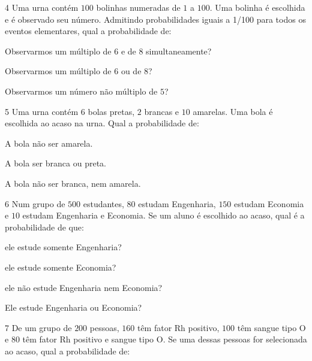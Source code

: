 
\num{4}  Uma urna contém $100$ bolinhas numeradas de $1$ a $100$. Uma bolinha é
escolhida e é observado seu número. Admitindo probabilidades iguais a
1/100 para todos os eventos elementares, qual a probabilidade de:

\begin{escolha}
\item Observarmos um múltiplo de $6$ e de $8$ simultaneamente? 
\item Observarmos um múltiplo de $6$ ou de $8$? 
\item Observarmos um número não múltiplo de $5$? 
\end{escolha}

\num{5}  Uma urna contém $6$ bolas pretas, $2$ brancas e $10$ amarelas. Uma bola é
escolhida ao acaso na urna. Qual a probabilidade de:

\begin{escolha}
\item A bola não ser amarela. 
\item A bola ser branca ou preta. 
\item A bola não ser branca, nem amarela. 
\end{escolha}

\num{6}  Num grupo de $500$ estudantes, $80$ estudam Engenharia, $150$ estudam
Economia e $10$ estudam Engenharia e Economia. Se um aluno é escolhido ao
acaso, qual é a probabilidade de que:

\begin{escolha}
\item ele estude somente Engenharia? 
\item ele estude somente Economia? 
\item ele não estude Engenharia nem Economia? 
\item Ele estude Engenharia ou Economia? 
\end{escolha}


\num{7}  De um grupo de $200$ pessoas, $160$ têm fator Rh positivo, $100$ têm sangue
tipo O e $80$ têm fator Rh positivo e sangue tipo O. Se uma dessas pessoas
for selecionada ao acaso, qual a probabilidade de:


